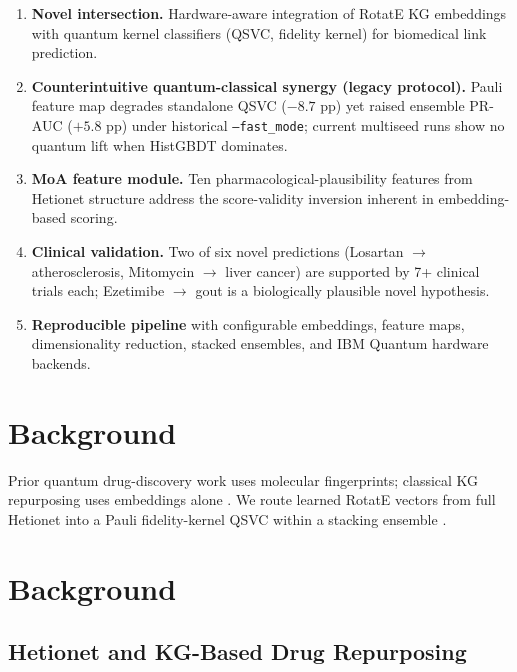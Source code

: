 \begin{enumerate}[leftmargin=*,label=\arabic*.]
\item \textbf{Novel intersection.} Hardware-aware integration of RotatE KG
  embeddings with quantum kernel classifiers (QSVC, fidelity kernel) for
  biomedical link prediction.
\item \textbf{Counterintuitive quantum-classical synergy (legacy protocol).}
  Pauli feature map degrades standalone QSVC ($-8.7$ pp) yet raised ensemble
  PR-AUC ($+5.8$ pp) under historical \texttt{--fast\_mode}; current multiseed
  runs show no quantum lift when HistGBDT dominates.
\item \textbf{MoA feature module.} Ten pharmacological-plausibility features
  from Hetionet structure address the score-validity inversion inherent in
  embedding-based scoring.
\item \textbf{Clinical validation.} Two of six novel predictions (Losartan
  $\to$ atherosclerosis, Mitomycin $\to$ liver cancer) are supported by 7+
  clinical trials each; Ezetimibe $\to$ gout is a biologically plausible novel
  hypothesis.
\item \textbf{Reproducible pipeline} with configurable embeddings, feature maps,
  dimensionality reduction, stacked ensembles, and IBM Quantum hardware
  backends.
\end{enumerate}

\ifqceshort
\section{Background}
Prior quantum drug-discovery work uses molecular fingerprints; classical KG
repurposing uses embeddings alone \cite{mayers2023}. We route learned RotatE
vectors from full Hetionet into a Pauli fidelity-kernel QSVC within a stacking
ensemble \cite{havlicek2019,schuld2019}.
\else
\section{Background}

\subsection{Hetionet and KG-Based Drug Repurposing}

